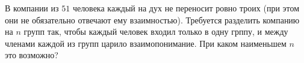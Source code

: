 \documentclass{article}
\begin{document}
В компании из $51$ человека каждый на дух не переносит ровно троих (при этом они не обязательно отвечают ему взаимностью). 
Требуется разделить компанию на $n$ групп так, чтобы каждый человек входил только в одну грппу, и между членами каждой из групп царило взаимопонимание. При каком наименьшем $n$ это возможно?
\end{document}
